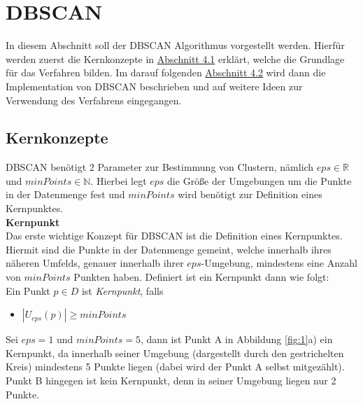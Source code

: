 \documentclass{lni}
\begin{document}
%
%

\section{DBSCAN}
In diesem Abschnitt soll der DBSCAN Algorithmus vorgestellt werden.
Hierfür werden zuerst die Kernkonzepte in \hyperref[sec:kern]{Abschnitt 4.1} erklärt, welche die Grundlage für das Verfahren bilden. Im darauf folgenden \hyperref[sec:impl]{Abschnitt 4.2} wird dann die Implementation von DBSCAN beschrieben und auf weitere Ideen zur Verwendung des Verfahrens eingegangen.

%
%

\subsection{Kernkonzepte}
\label{sec:kern}
DBSCAN benötigt 2 Parameter zur Bestimmung von Clustern, nämlich $eps \in \mathbb{R}$ und $minPoints \in \mathbb{N}$. Hierbei legt $eps$ die Größe der Umgebungen um die Punkte in der Datenmenge fest und $minPoints$ wird benötigt zur Definition eines Kernpunktes.\\


\textbf{Kernpunkt}\\
Das erste wichtige Konzept für DBSCAN ist die Definition eines Kernpunktes. Hiermit sind die Punkte in der Datenmenge gemeint, welche innerhalb ihres näheren Umfelds, genauer innerhalb ihrer $eps$-Umgebung, mindestens eine Anzahl von $minPoints$ Punkten haben. Definiert ist ein Kernpunkt dann wie folgt:\\
Ein Punkt $ p \in D $ ist \textit{Kernpunkt}, falls
\begin{itemize}
    \item $ | U_{eps}(p) | \geq minPoints  $
\end{itemize}
Sei $eps = 1$ und $minPoints = 5$, dann ist Punkt A in Abbildung \ref{fig:1}a) ein Kernpunkt, da innerhalb seiner Umgebung (dargestellt durch den gestrichelten Kreis) mindestens 5 Punkte liegen (dabei wird der Punkt A selbst mitgezählt). Punkt B hingegen ist kein Kernpunkt, denn in seiner Umgebung liegen nur 2 Punkte.\\

\end{document}
